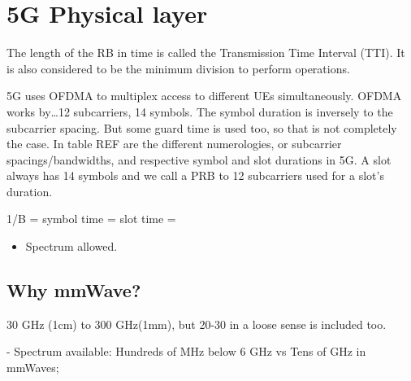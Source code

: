 \section{5G Physical layer}
\label{sec:5gphy}

The length of the RB in time is called the Transmission Time Interval
(TTI). It is also considered to be the minimum division to perform operations. 

5G uses \ac{OFDMA} to multiplex access to different UEs simultaneously. OFDMA works by\dots 12 subcarriers, 14 symbols. The symbol duration is inversely  to the subcarrier spacing. But some guard time is used too, so that is not completely the case. In table REF are the different numerologies, or subcarrier spacings/bandwidths, and respective symbol and slot durations in 5G. A slot always has 14 symbols and we call a \ac{PRB} to 12 subcarriers used for a slot's duration.

1/B = 
symbol time = 
slot time = 








\begin{itemize}
    \item Spectrum allowed. 
\end{itemize}


\subsection{Why mmWave?}

30 GHz (1cm) to 300 GHz(1mm), but 20-30 in a loose sense is included too.



- Spectrum available: Hundreds of MHz below 6 GHz vs Tens of GHz in mmWaves;

